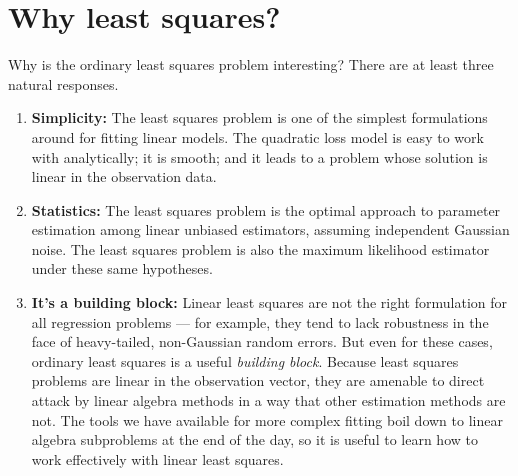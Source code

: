 
\section{Why least squares?}

Why is the ordinary least squares problem interesting?
There are at least three natural responses.

\begin{enumerate}
  \item {\bf Simplicity:}
  The least squares problem is one of the simplest formulations
  around for fitting linear models.  The quadratic loss model
  is easy to work with analytically; it is smooth; and it leads
  to a problem whose solution is linear in the observation data.

  \item {\bf Statistics:}
  The least squares problem is the optimal approach to parameter
  estimation among linear unbiased estimators, assuming independent
  Gaussian noise.  The least squares problem is also the maximum likelihood
  estimator under these same hypotheses.

  \item {\bf It's a building block:}
  Linear least squares are not the right formulation for all regression
  problems --- for example, they tend to lack robustness in the face of
  heavy-tailed, non-Gaussian random errors.  But even for these cases,
  ordinary least squares is a useful {\em building block}.
  Because least squares problems are linear in the observation vector,
  they are amenable to direct attack by linear algebra methods in a way
  that other estimation methods are not.  The tools we
  have available for more complex fitting boil down to linear algebra
  subproblems at the end of the day, so it is useful to learn how to work
  effectively with linear least squares.
\end{enumerate}
